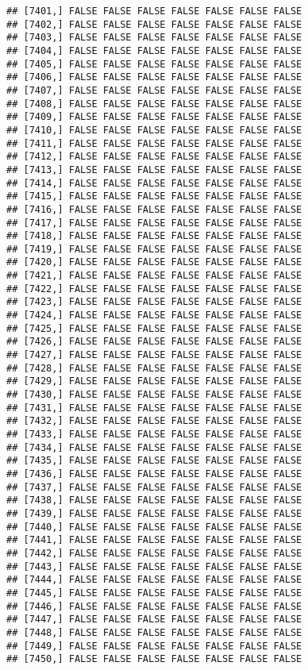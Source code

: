 \documentclass[
]{article}
\begin{document}
\begin{verbatim}
## [7401,] FALSE FALSE FALSE FALSE FALSE FALSE FALSE
## [7402,] FALSE FALSE FALSE FALSE FALSE FALSE FALSE
## [7403,] FALSE FALSE FALSE FALSE FALSE FALSE FALSE
## [7404,] FALSE FALSE FALSE FALSE FALSE FALSE FALSE
## [7405,] FALSE FALSE FALSE FALSE FALSE FALSE FALSE
## [7406,] FALSE FALSE FALSE FALSE FALSE FALSE FALSE
## [7407,] FALSE FALSE FALSE FALSE FALSE FALSE FALSE
## [7408,] FALSE FALSE FALSE FALSE FALSE FALSE FALSE
## [7409,] FALSE FALSE FALSE FALSE FALSE FALSE FALSE
## [7410,] FALSE FALSE FALSE FALSE FALSE FALSE FALSE
## [7411,] FALSE FALSE FALSE FALSE FALSE FALSE FALSE
## [7412,] FALSE FALSE FALSE FALSE FALSE FALSE FALSE
## [7413,] FALSE FALSE FALSE FALSE FALSE FALSE FALSE
## [7414,] FALSE FALSE FALSE FALSE FALSE FALSE FALSE
## [7415,] FALSE FALSE FALSE FALSE FALSE FALSE FALSE
## [7416,] FALSE FALSE FALSE FALSE FALSE FALSE FALSE
## [7417,] FALSE FALSE FALSE FALSE FALSE FALSE FALSE
## [7418,] FALSE FALSE FALSE FALSE FALSE FALSE FALSE
## [7419,] FALSE FALSE FALSE FALSE FALSE FALSE FALSE
## [7420,] FALSE FALSE FALSE FALSE FALSE FALSE FALSE
## [7421,] FALSE FALSE FALSE FALSE FALSE FALSE FALSE
## [7422,] FALSE FALSE FALSE FALSE FALSE FALSE FALSE
## [7423,] FALSE FALSE FALSE FALSE FALSE FALSE FALSE
## [7424,] FALSE FALSE FALSE FALSE FALSE FALSE FALSE
## [7425,] FALSE FALSE FALSE FALSE FALSE FALSE FALSE
## [7426,] FALSE FALSE FALSE FALSE FALSE FALSE FALSE
## [7427,] FALSE FALSE FALSE FALSE FALSE FALSE FALSE
## [7428,] FALSE FALSE FALSE FALSE FALSE FALSE FALSE
## [7429,] FALSE FALSE FALSE FALSE FALSE FALSE FALSE
## [7430,] FALSE FALSE FALSE FALSE FALSE FALSE FALSE
## [7431,] FALSE FALSE FALSE FALSE FALSE FALSE FALSE
## [7432,] FALSE FALSE FALSE FALSE FALSE FALSE FALSE
## [7433,] FALSE FALSE FALSE FALSE FALSE FALSE FALSE
## [7434,] FALSE FALSE FALSE FALSE FALSE FALSE FALSE
## [7435,] FALSE FALSE FALSE FALSE FALSE FALSE FALSE
## [7436,] FALSE FALSE FALSE FALSE FALSE FALSE FALSE
## [7437,] FALSE FALSE FALSE FALSE FALSE FALSE FALSE
## [7438,] FALSE FALSE FALSE FALSE FALSE FALSE FALSE
## [7439,] FALSE FALSE FALSE FALSE FALSE FALSE FALSE
## [7440,] FALSE FALSE FALSE FALSE FALSE FALSE FALSE
## [7441,] FALSE FALSE FALSE FALSE FALSE FALSE FALSE
## [7442,] FALSE FALSE FALSE FALSE FALSE FALSE FALSE
## [7443,] FALSE FALSE FALSE FALSE FALSE FALSE FALSE
## [7444,] FALSE FALSE FALSE FALSE FALSE FALSE FALSE
## [7445,] FALSE FALSE FALSE FALSE FALSE FALSE FALSE
## [7446,] FALSE FALSE FALSE FALSE FALSE FALSE FALSE
## [7447,] FALSE FALSE FALSE FALSE FALSE FALSE FALSE
## [7448,] FALSE FALSE FALSE FALSE FALSE FALSE FALSE
## [7449,] FALSE FALSE FALSE FALSE FALSE FALSE FALSE
## [7450,] FALSE FALSE FALSE FALSE FALSE FALSE FALSE

\end{verbatim}
\end{document}
